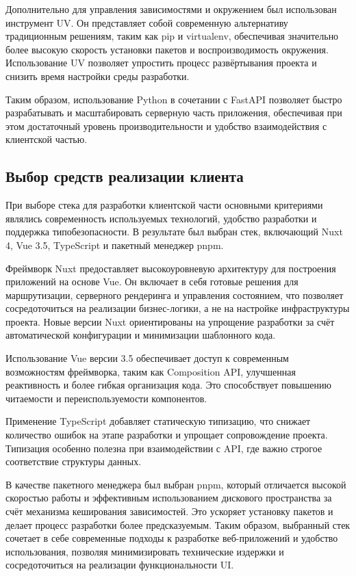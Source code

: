 Дополнительно для управления зависимостями и окружением был использован инструмент UV. Он представляет собой современную альтернативу традиционным решениям, таким как pip и virtualenv, обеспечивая значительно более высокую скорость установки пакетов и воспроизводимость окружения. Использование UV позволяет упростить процесс развёртывания проекта и снизить время настройки среды разработки.

Таким образом, использование Python в сочетании с FastAPI позволяет быстро разрабатывать и масштабировать серверную часть приложения, обеспечивая при этом достаточный уровень производительности и удобство взаимодействия с клиентской частью.

\subsection{Выбор средств реализации клиента}

При выборе стека для разработки клиентской части основными критериями являлись современность используемых технологий, удобство разработки и поддержка типобезопасности. В результате был выбран стек, включающий Nuxt 4, Vue 3.5, TypeScript и пакетный менеджер pnpm.

Фреймворк Nuxt \cite{nuxt:docs} предоставляет высокоуровневую архитектуру для построения приложений на основе Vue. Он включает в себя готовые решения для маршрутизации, серверного рендеринга и управления состоянием, что позволяет сосредоточиться на реализации бизнес-логики, а не на настройке инфраструктуры проекта. Новые версии Nuxt ориентированы на упрощение разработки за счёт автоматической конфигурации и минимизации шаблонного кода.

Использование Vue версии 3.5 обеспечивает доступ к современным возможностям фреймворка, таким как Composition API, улучшенная реактивность и более гибкая организация кода. Это способствует повышению читаемости и переиспользуемости компонентов.

Применение TypeScript добавляет статическую типизацию, что снижает количество ошибок на этапе разработки и упрощает сопровождение проекта. Типизация особенно полезна при взаимодействии с API, где важно строгое соответствие структуры данных.

В качестве пакетного менеджера был выбран pnpm, который отличается высокой скоростью работы и эффективным использованием дискового пространства за счёт механизма кеширования зависимостей. Это ускоряет установку пакетов и делает процесс разработки более предсказуемым.
Таким образом, выбранный стек сочетает в себе современные подходы к разработке веб-приложений и удобство использования, позволяя минимизировать технические издержки и сосредоточиться на реализации функциональности UI.

